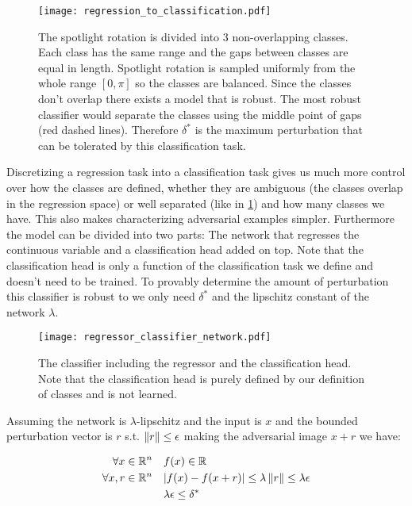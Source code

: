 \documentclass[../thesis.tex]{subfiles}
\begin{document}
\begin{figure}
	\centering
	\texttt{[image: regression\_to\_classification.pdf]}
	\caption{The spotlight rotation is divided into 3 non-overlapping classes. Each class has the same range and the gaps between classes are equal in length. Spotlight rotation is sampled uniformly from the whole range $[0,\pi]$ so the classes are balanced. Since the classes don't overlap there exists a model that is robust. The most robust classifier would separate the classes using the middle point of gaps (red dashed lines). Therefore $\delta^*$ is the maximum perturbation that can be tolerated by this classification task.}
	\label{fig:spotlight_rotation_classes}
\end{figure}

Discretizing a regression task into a classification task gives us much more control over how the classes are defined, whether they are ambiguous (the classes overlap in the regression space) or well separated (like in \ref{fig:spotlight_rotation_classes}) and how many classes we have. This also makes characterizing adversarial examples simpler. Furthermore the model can be divided into two parts: The network that regresses the continuous variable and a classification head added on top. Note that the classification head is only a function of the classification task we define and doesn't need to be trained. To provably determine the amount of perturbation this classifier is robust to we only need $\delta^*$ and the lipschitz constant of the network $\lambda$. 

\begin{figure}
	\centering
	\texttt{[image: regressor\_classifier\_network.pdf]}
	\caption{The classifier including the regressor and the classification head. Note that the classification head is purely defined by our definition of classes and is not learned.}
	\label{fig:regressor_classifier}
\end{figure}

Assuming the network is $\lambda$-lipschitz and the input is $x$ and the bounded perturbation vector is $r$ s.t. $\left\lVert r\right\rVert \leq \epsilon$ making the adversarial image $x+r$ we have: 

\begin{align}
	\forall x \in \mathbb{R}^n \quad &f(x)\in \mathbb{R} \\
	\forall x,r \in \mathbb{R}^n \quad & |f(x) - f(x+r)| \leq 
	\lambda \left\lVert r\right\rVert  \leq   \lambda  \epsilon \\
	& \lambda  \epsilon \leq \delta^*
\end{align}
\end{document}
